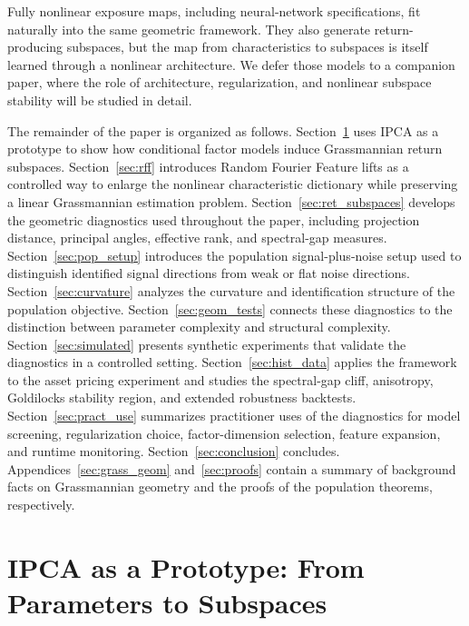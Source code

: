 \documentclass[11pt,letterpaper]{article}
\begin{document}
Fully nonlinear exposure maps, including neural-network specifications, fit naturally into the same geometric framework. They also generate return-producing subspaces, but the map from characteristics to subspaces is itself learned through a nonlinear architecture. We defer those models to a companion paper, where the role of architecture, regularization, and nonlinear subspace stability will be studied in detail.

The remainder of the paper is organized as follows. Section~\ref{sec:ipca} uses IPCA as a prototype to show how conditional factor models induce Grassmannian return subspaces. Section~\ref{sec:rff} introduces Random Fourier Feature lifts as a controlled way to enlarge the nonlinear characteristic dictionary while preserving a linear Grassmannian estimation problem. Section~\ref{sec:ret_subspaces} develops the geometric diagnostics used throughout the paper, including projection distance, principal angles, effective rank, and spectral-gap measures. Section~\ref{sec:pop_setup} introduces the population signal-plus-noise setup used to distinguish identified signal directions from weak or flat noise directions. Section~\ref{sec:curvature} analyzes the curvature and identification structure of the population objective. Section~\ref{sec:geom_tests} connects these diagnostics to the distinction between parameter complexity and structural complexity. Section~\ref{sec:simulated} presents synthetic experiments that validate the diagnostics in a controlled setting. Section~\ref{sec:hist_data} applies the framework to the asset pricing   experiment and studies the spectral-gap cliff, anisotropy, Goldilocks stability region, and extended robustness backtests. Section~\ref{sec:pract_use} summarizes practitioner uses of the diagnostics for model screening, regularization choice, factor-dimension selection, feature expansion, and runtime monitoring. Section~\ref{sec:conclusion} concludes. Appendices~\ref{sec:grass_geom} and~\ref{sec:proofs} contain a summary of background facts on Grassmannian geometry and the proofs of the population theorems, respectively.


\section{IPCA as a Prototype: From Parameters to Subspaces}
\label{sec:ipca}

\end{document}
